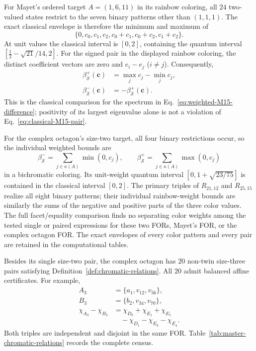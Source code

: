 \documentclass[aps,pra,reprint,superscriptaddress,longbibliography,nofootinbib,floatfix,10pt]{revtex4-2}
\theoremstyle{definition}\newtheorem{definition}[theorem]{Definition}
\theoremstyle{remark}\newtheorem{remark}[theorem]{Remark}
\newcommand{\Sc}{\mathcal S}\newcommand{\Cc}{\mathcal C}\newcommand{\Wc}{\mathcal W}
\begin{document}
For Mayet's ordered target $A=(1,6,11)$ in its rainbow coloring, all $24$ two-valued states restrict to the seven binary patterns other than $(1,1,1)$. The exact classical envelope is therefore the minimum and maximum of
\begin{equation}\label{eq:classical-M15-single}
\{0,c_0,c_1,c_2,c_0+c_1,c_0+c_2,c_1+c_2\}.
\end{equation}
At unit values the classical interval is $[0,2]$, containing the quantum interval $[\tfrac12-\sqrt{21}/14,2]$. For the signed pair in the displayed rainbow coloring, the distinct coefficient vectors are zero and $e_i-e_j$ ($i\ne j$). Consequently,
\begin{equation}\label{eq:classical-M15-pair}
\begin{aligned}
\beta^+_{\Sc}(\mathbf c)&=\max_jc_j-\min_jc_j,\\
\beta^-_{\Sc}(\mathbf c)&=-\beta^+_{\Sc}(\mathbf c).
\end{aligned}
\end{equation}
This is the classical comparison for the spectrum in Eq.~\eqref{eq:weighted-M15-difference}; positivity of its largest eigenvalue alone is not a violation of Eq.~\eqref{eq:classical-M15-pair}.

For the complex octagon's size-two target, all four binary restrictions occur, so the individual weighted bounds are
\begin{equation}\label{eq:classical-octagon-envelope}
\beta^-_{\Sc}=\sum_{j\in\kappa(A)}\min(0,c_j),\qquad
\beta^+_{\Sc}=\sum_{j\in\kappa(A)}\max(0,c_j)
\end{equation}
in a bichromatic coloring. Its unit-weight quantum interval $[0,1+\sqrt{23/75}]$ is contained in the classical interval $[0,2]$. The primary triples of $R_{21,12}$ and $R_{25,15}$ realize all eight binary patterns; their individual rainbow-weight bounds are similarly the sums of the negative and positive parts of the three color values. The full facet/equality comparison finds no separating color weights among the tested single or paired expressions for these two FORs, Mayet's FOR, or the complex octagon FOR. The exact envelopes of every color pattern and every pair are retained in the computational tables.

Besides its single size-two pair, the complex octagon has $20$ non-twin size-three pairs satisfying Definition~\ref{def:chromatic-relations}. All $20$ admit balanced affine certificates. For example,
\begin{equation}\label{eq:octagon-size3-certificate}
\begin{aligned}
A_3&=\{a_1,v_{12},v_{56}\},\\
B_3&=\{b_2,v_{34},v_{70}\},\\
\chi_{A_3}-\chi_{B_3}
&=\chi_{D_0}+\chi_{E_1}+\chi_{E_5}\\
&\quad-\chi_{D_1}-\chi_{E_0}-\chi_{E_4}.
\end{aligned}
\end{equation}
Both triples are independent and disjoint in the same FOR. Table~\ref{tab:master-chromatic-relations} records the complete census.
\end{document}
